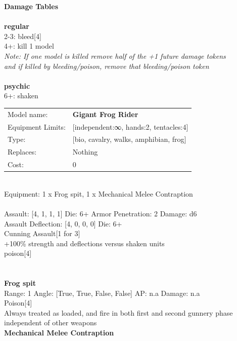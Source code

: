 {\bf Damage Tables} \\
\ \\ {\bf regular } \\
2-3: bleed[4] \\
4+: kill 1 model \\
{{\it Note: If one model is killed remove half of the +1 future damage tokens \\ and if killed by bleeding/poison, remove that bleeding/poison token}} \\
\ \\ {\bf psychic } \\
6+: shaken \\


\noindent
\begin{tabular}{ll}
Model name: &{\bf Gigant Frog Rider } \\
Equipment Limits: &[independent:∞, hands:2, tentacles:4] \\
Type: &[bio, cavalry, walks, amphibian, frog] \\
Replaces: &Nothing \\
Cost: & 0\\
\end{tabular}
\ \\
Equipment: 1 x Frog spit, 1 x Mechanical Melee Contraption \\
\ \\
Assault: [4, 1, 1, 1] Die: 6+ Armor Penetration: 2 Damage: d6 \\
Assault Deflection: [4, 0, 0, 0] Die: 6+\\
\indent Cunning Assault[1 for 3]\\ 
+100\% strength and deflections versus shaken units\\ 
poison[4]\\ 
 
\ \\

\ \\
{\bf Frog spit } \\



Range: 1  Angle: [True, True, False, False] AP: n.a Damage: n.a \\
Poison[4]\\ 
Always treated as loaded, and fire in both first and second gunnery phase independent of other weapons\\ 




{\bf Mechanical Melee Contraption } \\

